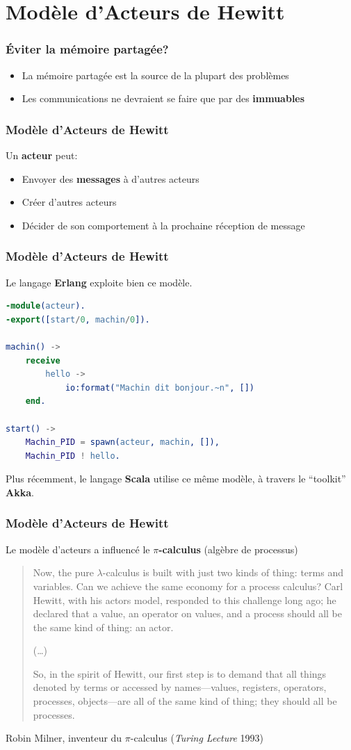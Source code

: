 \documentclass{beamer}
\begin{document}
\section{Modèle d'Acteurs de Hewitt}
\begin{frame}
  \frametitle{Éviter la mémoire partagée?}
  \begin{itemize}
  \item La mémoire partagée est la source de la plupart des problèmes
  \item Les communications ne devraient se faire que par des \textbf{immuables}
  \end{itemize}
\end{frame}
\begin{frame}[fragile]
  \frametitle{Modèle d'Acteurs de Hewitt}
  Un \textbf{acteur} peut:
  \begin{itemize}
  \item Envoyer des \textbf{messages} à d'autres acteurs
  \item Créer d'autres acteurs
  \item Décider de son comportement à la prochaine réception de message
  \end{itemize}
\end{frame}
\begin{frame}[fragile]
  \frametitle{Modèle d'Acteurs de Hewitt}
  Le langage \textbf{Erlang} exploite bien ce modèle.
  \begin{center}
\begin{lstlisting}[language=erlang]
-module(acteur).
-export([start/0, machin/0]).

machin() ->
    receive
        hello ->
            io:format("Machin dit bonjour.~n", [])
    end.

start() ->
    Machin_PID = spawn(acteur, machin, []),
    Machin_PID ! hello.
\end{lstlisting}
\end{center}
  Plus récemment, le langage \textbf{Scala} utilise ce même modèle, à travers le
  ``toolkit'' \textbf{Akka}.
\end{frame}
\begin{frame}
  \frametitle{Modèle d'Acteurs de Hewitt}
  Le modèle d'acteurs a influencé le \textbf{$\pi$-calculus} (algèbre de processus)
  \par\bigskip
  \begin{quotation}\small
    Now, the pure $\lambda$-calculus is built with just two kinds of thing: terms
    and variables. Can we achieve the same economy for a process calculus? Carl
    Hewitt, with his actors model, responded to this challenge long ago; he
    declared that a value, an operator on values, and a process should all be
    the same kind of thing: an actor.

    (\ldots)
    
    So, in the spirit of Hewitt, our first step is to demand that all things
    denoted by terms or accessed by names—values, registers, operators,
    processes, objects—are all of the same kind of thing; they should all be
    processes.
  \end{quotation}
  \hfill Robin Milner, inventeur du $\pi$-calculus (\textit{Turing Lecture} 1993)
\end{frame}
\end{document}
